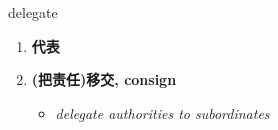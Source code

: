 
\begin{frame}
{\huge delegate}
\begin{center}
\begin{enumerate}\Large
  \item \textbf{代表}
  \item \textbf{(把责任)移交, consign}
  \begin{itemize}
    \item \em{\Large{delegate authorities to subordinates}}
  \end{itemize}
\end{enumerate}
\end{center}
\end{frame}
